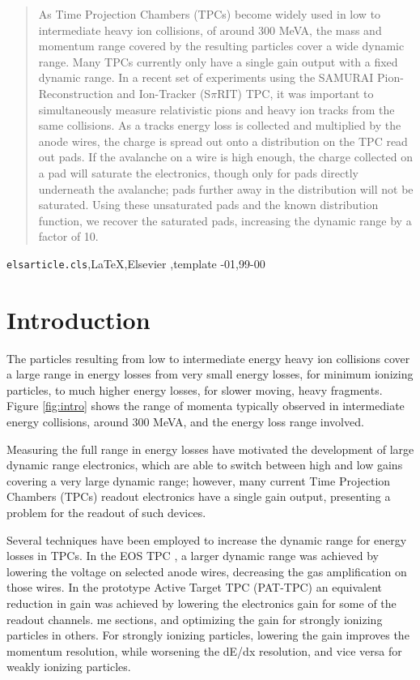 \documentclass[review]{elsarticle}
\begin{document}
\begin{frontmatter}
\begin{abstract}
As Time Projection Chambers (TPCs) become widely used in low to intermediate heavy ion collisions, of around 300 MeVA, the mass and momentum range covered by the resulting particles cover a wide dynamic range. Many TPCs currently only have a single gain output with a fixed dynamic range. In a recent set of experiments using the SAMURAI Pion-Reconstruction and Ion-Tracker (S$\pi$RIT) TPC, it was important to simultaneously measure relativistic pions and heavy ion tracks from the same collisions. As a tracks energy loss is collected and multiplied by the anode wires, the charge is spread out onto a distribution on the TPC read out pads. If the avalanche on a wire is high enough, the charge collected on a pad will saturate the electronics, though only for pads directly underneath the avalanche; pads further away in the distribution will not be saturated. Using these unsaturated pads and the known distribution function, we recover the saturated pads, increasing the dynamic range by a factor of 10.

\end{abstract}

\begin{keyword}
\texttt{elsarticle.cls}\sep \LaTeX\sep Elsevier \sep template
-01\sep  99-00
\end{keyword}

\end{frontmatter}

\linenumbers

\section{Introduction} 
 The particles resulting from low to intermediate energy heavy ion collisions cover a large range in energy losses from very small energy losses, for minimum ionizing particles, to much higher energy losses, for slower moving, heavy fragments. Figure \ref{fig:intro} shows the range of momenta typically observed in intermediate energy collisions, around 300 MeVA, and the energy loss range involved.  
 
  Measuring the full range in energy losses have motivated the development of large dynamic range electronics, which are able to switch between high and low gains covering a very large dynamic range; however, many current Time Projection Chambers (TPCs) readout electronics have a single gain output, presenting a problem for the readout of such devices.
 
 Several techniques have been employed to increase the dynamic range for energy losses in TPCs. In the EOS TPC \cite{eos}, a larger dynamic range was achieved by lowering the voltage on selected anode wires, decreasing the gas amplification on those wires. In the prototype Active Target TPC (PAT-TPC) an equivalent reduction in gain was achieved by lowering the electronics gain for some of the readout channels. 
me sections, and optimizing the gain for strongly ionizing particles in others. For strongly ionizing particles, lowering the gain improves the momentum resolution, while worsening the dE/dx resolution, and vice versa for weakly ionizing particles. 
 
\end{document}
